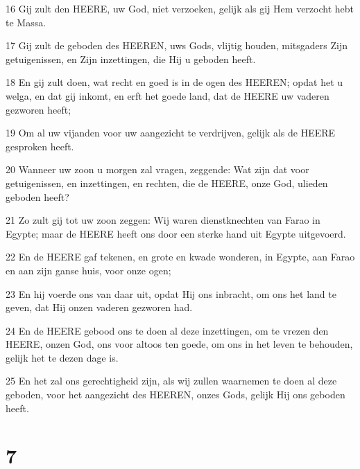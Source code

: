 \par 16 Gij zult den HEERE, uw God, niet verzoeken, gelijk als gij Hem verzocht hebt te Massa.
\par 17 Gij zult de geboden des HEEREN, uws Gods, vlijtig houden, mitsgaders Zijn getuigenissen, en Zijn inzettingen, die Hij u geboden heeft.
\par 18 En gij zult doen, wat recht en goed is in de ogen des HEEREN; opdat het u welga, en dat gij inkomt, en erft het goede land, dat de HEERE uw vaderen gezworen heeft;
\par 19 Om al uw vijanden voor uw aangezicht te verdrijven, gelijk als de HEERE gesproken heeft.
\par 20 Wanneer uw zoon u morgen zal vragen, zeggende: Wat zijn dat voor getuigenissen, en inzettingen, en rechten, die de HEERE, onze God, ulieden geboden heeft?
\par 21 Zo zult gij tot uw zoon zeggen: Wij waren dienstknechten van Farao in Egypte; maar de HEERE heeft ons door een sterke hand uit Egypte uitgevoerd.
\par 22 En de HEERE gaf tekenen, en grote en kwade wonderen, in Egypte, aan Farao en aan zijn ganse huis, voor onze ogen;
\par 23 En hij voerde ons van daar uit, opdat Hij ons inbracht, om ons het land te geven, dat Hij onzen vaderen gezworen had.
\par 24 En de HEERE gebood ons te doen al deze inzettingen, om te vrezen den HEERE, onzen God, ons voor altoos ten goede, om ons in het leven te behouden, gelijk het te dezen dage is.
\par 25 En het zal ons gerechtigheid zijn, als wij zullen waarnemen te doen al deze geboden, voor het aangezicht des HEEREN, onzes Gods, gelijk Hij ons geboden heeft.

\chapter{7}

